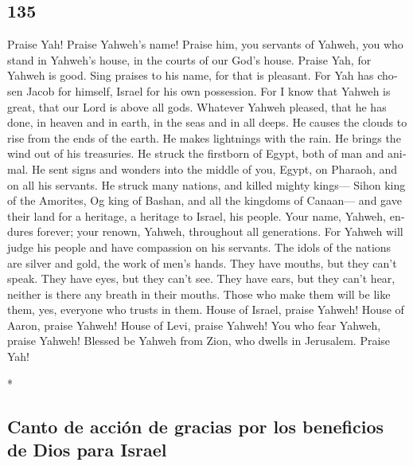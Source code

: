 \begin{paracol}{2}
\switchcolumn
\begin{otherlanguage}{english}

\hypertarget{section-269}{%
\section{135}\label{section-269}}

 Praise Yah! Praise Yahweh's name! Praise him, you
servants of Yahweh,  you who stand in Yahweh's house, in
the courts of our God's house.  Praise Yah, for Yahweh is
good. Sing praises to his name, for that is pleasant.  For
Yah has chosen Jacob for himself, Israel for his own possession.
 For I know that Yahweh is great, that our Lord is above
all gods.  Whatever Yahweh pleased, that he has done, in
heaven and in earth, in the seas and in all deeps.  He
causes the clouds to rise from the ends of the earth. He makes
lightnings with the rain. He brings the wind out of his treasuries.
 He struck the firstborn of Egypt, both of man and animal.
 He sent signs and wonders into the middle of you, Egypt,
on Pharaoh, and on all his servants.  He struck many
nations, and killed mighty kings---  Sihon king of the
Amorites, Og king of Bashan, and all the kingdoms of Canaan---
 and gave their land for a heritage, a heritage to
Israel, his people.  Your name, Yahweh, endures forever;
your renown, Yahweh, throughout all generations.  For
Yahweh will judge his people and have compassion on his servants.
 The idols of the nations are silver and gold, the work
of men's hands.  They have mouths, but they can't speak.
They have eyes, but they can't see.  They have ears, but
they can't hear, neither is there any breath in their mouths.
 Those who make them will be like them, yes, everyone who
trusts in them.  House of Israel, praise Yahweh! House of
Aaron, praise Yahweh!  House of Levi, praise Yahweh! You
who fear Yahweh, praise Yahweh!  Blessed be Yahweh from
Zion, who dwells in Jerusalem. Praise Yah!

\end{otherlanguage}

\switchcolumn[0]*

\hypertarget{canto-de-acciuxf3n-de-gracias-por-los-beneficios-de-dios-para-israel}{%
\subsection{Canto de acción de gracias por los beneficios de Dios para
Israel}\label{canto-de-acciuxf3n-de-gracias-por-los-beneficios-de-dios-para-israel}}


\end{paracol}
